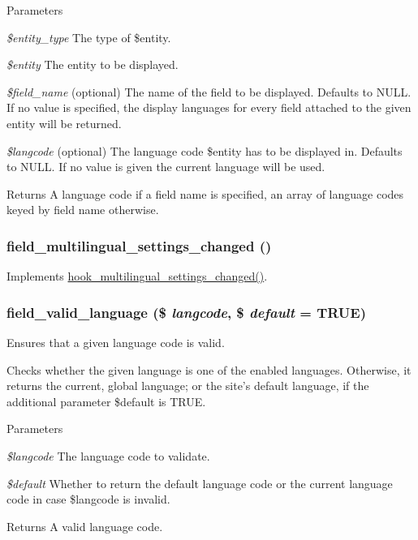 \begin{DoxyParams}{Parameters}
\item[{\em \$entity\_\-type}]The type of \$entity. \item[{\em \$entity}]The entity to be displayed. \item[{\em \$field\_\-name}](optional) The name of the field to be displayed. Defaults to NULL. If no value is specified, the display languages for every field attached to the given entity will be returned. \item[{\em \$langcode}](optional) The language code \$entity has to be displayed in. Defaults to NULL. If no value is given the current language will be used.\end{DoxyParams}
\begin{DoxyReturn}{Returns}
A language code if a field name is specified, an array of language codes keyed by field name otherwise. 
\end{DoxyReturn}
\hypertarget{group__field__language_gafbd7a022815887d2aadf983656571e98}{
\subsubsection[{field\_\-multilingual\_\-settings\_\-changed}]{\setlength{\rightskip}{0pt plus 5cm}field\_\-multilingual\_\-settings\_\-changed ()}}
\label{group__field__language_gafbd7a022815887d2aadf983656571e98}
Implements \hyperlink{group__hooks_ga87a996b741bb1787b2451a2b842e20e8}{hook\_\-multilingual\_\-settings\_\-changed()}. \hypertarget{group__field__language_ga3c8ddbf445782a8ac352279c606aa30c}{
\subsubsection[{field\_\-valid\_\-language}]{\setlength{\rightskip}{0pt plus 5cm}field\_\-valid\_\-language (\$ {\em langcode}, \/  \$ {\em default} = {\ttfamily TRUE})}}
\label{group__field__language_ga3c8ddbf445782a8ac352279c606aa30c}
Ensures that a given language code is valid.

Checks whether the given language is one of the enabled languages. Otherwise, it returns the current, global language; or the site's default language, if the additional parameter \$default is TRUE.


\begin{DoxyParams}{Parameters}
\item[{\em \$langcode}]The language code to validate. \item[{\em \$default}]Whether to return the default language code or the current language code in case \$langcode is invalid. \end{DoxyParams}
\begin{DoxyReturn}{Returns}
A valid language code. 
\end{DoxyReturn}
